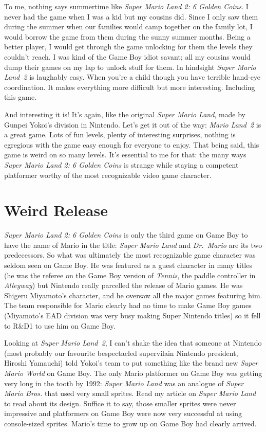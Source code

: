 \documentclass{book}
\begin{document}
To me, nothing says summertime like \emph{Super Mario Land 2: 6 Golden Coins}. I never had the game when I was a kid but my cousins did. Since I only saw them during the summer when our families would camp together on the family lot, I would borrow the game from them during the sunny summer months. Being a better player, I would get through the game unlocking for them the levels they couldn’t reach. I was kind of the Game Boy idiot savant; all my cousins would dump their games on my lap to unlock stuff for them. In hindsight \emph{Super Mario Land~2} is laughably easy. When you’re a child though you have terrible hand-eye coordination. It makes everything more difficult but more interesting. Including this game.\par
And interesting it is! It’s again, like the original \emph{Super Mario Land}, made by Gunpei Yokoi’s division in Nintendo. Let’s get it out of the way: \emph{Mario Land~2} is a great game. Lots of fun levels, plenty of interesting surprises, nothing is egregious with the game easy enough for everyone to enjoy. That being said, this game is weird on so many levels. It’s essential to me for that: the many ways \emph{Super Mario Land 2: 6 Golden Coins} is strange while staying a competent platformer worthy of the most recognizable video game character.\par
\FloatBarrier\section*{Weird Release}
\emph{Super Mario Land 2: 6 Golden Coins} is only the third game on Game Boy to have the name of Mario in the title: \emph{Super Mario Land} and \emph{Dr.~Mario} are its two predecessors. So what was ultimately the most recognizable game character was seldom seen on Game Boy. He was featured as a guest character in many titles (he was the referee on the Game Boy version of \emph{Tennis}, the paddle controller in \emph{Alleyway}) but Nintendo really parcelled the release of Mario games. He was Shigeru Miyamoto’s character, and he oversaw all the major games featuring him. The team responsible for Mario clearly had no time to make Game Boy games (Miyamoto’s EAD division was very busy making Super Nintendo titles) so it fell to R\&D1 to use him on Game Boy.\par
Looking at \emph{Super Mario Land~2}, I can’t shake the idea that someone at Nintendo (most probably our favourite bespectacled supervilain Nintendo president, Hiroshi Yamauchi) told Yokoi’s team to put something like the brand new \emph{Super Mario World} on Game Boy. The only Mario platformer on Game Boy was getting very long in the tooth by 1992: \emph{Super Mario Land} was an analogue of \emph{Super Mario Bros.} that used very small sprites. Read my article on \emph{Super Mario Land} to read about its design. Suffice it to say, those smaller sprites were never impressive and platformers on Game Boy were now very successful at using console-sized sprites. Mario’s time to grow up on Game Boy had clearly arrived.\par
\end{document}
